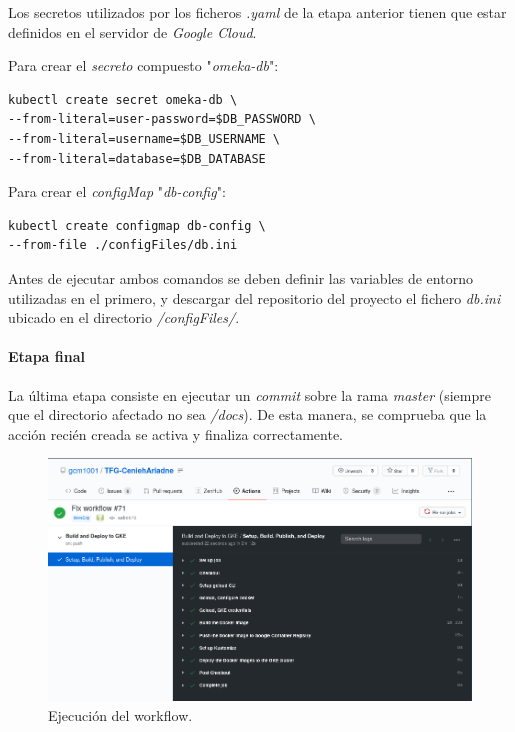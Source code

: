 \documentclass[
]{article}
\begin{document}
Los secretos utilizados por los ficheros \emph{.yaml} de la etapa
anterior tienen que estar definidos en el servidor de \emph{Google
Cloud}.

Para crear el \emph{secreto} compuesto "\emph{omeka-db}":

\begin{verbatim}
kubectl create secret omeka-db \
--from-literal=user-password=$DB_PASSWORD \
--from-literal=username=$DB_USERNAME \
--from-literal=database=$DB_DATABASE
\end{verbatim}

Para crear el \emph{configMap} "\emph{db-config}":

\begin{verbatim}
kubectl create configmap db-config \
--from-file ./configFiles/db.ini
\end{verbatim}

Antes de ejecutar ambos comandos se deben definir las variables de
entorno utilizadas en el primero, y descargar del repositorio del
proyecto el fichero \emph{db.ini} ubicado en el directorio
\emph{/configFiles/}.

\hypertarget{etapa-final}{%
\paragraph{Etapa final}\label{etapa-final}}

La última etapa consiste en ejecutar un \emph{commit} sobre la rama
\emph{master} (siempre que el directorio afectado no sea \emph{/docs}).
De esta manera, se comprueba que la acción recién creada se activa y
finaliza correctamente.

\begin{figure}
\hypertarget{workflow}{%
\centering
\includegraphics{../_static/images/workflow.png}
\caption{Ejecución del workflow.}\label{workflow}
}
\end{figure}
\end{document}
